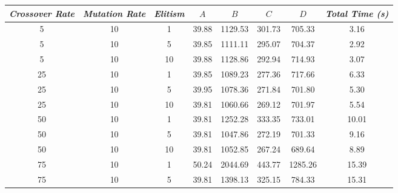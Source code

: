 
\begin{table}[h]
\centering
\footnotesize
{\renewcommand{\arraystretch}{1}}
\begin{tabular}{ccc|c|c|c|c|c}
\textit{Crossover Rate} & \textit{Mutation Rate} & \textit{Elitism} & $A$ & $B$ & $C$ & $D$ & \textit{Total Time (s)} \\\hline
5 & 10 & 1 & \cellcolor{gray!50}39.88 & \cellcolor{gray!13}1129.53 & \cellcolor{gray!1}301.73 & \cellcolor{gray!42}705.33 & 3.16\\
5 & 10 & 5 & \cellcolor{gray!50}39.85 & \cellcolor{gray!16}1111.11 & \cellcolor{gray!1}295.07 & \cellcolor{gray!42}704.37 & 2.92\\
5 & 10 & 10 & \cellcolor{gray!50}39.88 & \cellcolor{gray!13}1128.86 & \cellcolor{gray!1}292.94 & \cellcolor{gray!39}714.93 & 3.07\\
25 & 10 & 1 & \cellcolor{gray!50}39.85 & \cellcolor{gray!21}1089.23 & \cellcolor{gray!4}277.36 & \cellcolor{gray!38}717.66 & 6.33\\
25 & 10 & 5 & \cellcolor{gray!49}39.95 & \cellcolor{gray!23}1078.36 & \cellcolor{gray!10}271.84 & \cellcolor{gray!43}701.80 & 5.30\\
25 & 10 & 10 & \cellcolor{gray!50}39.81 & \cellcolor{gray!26}1060.66 & \cellcolor{gray!13}269.12 & \cellcolor{gray!43}701.97 & 5.54\\
50 & 10 & 1 & \cellcolor{gray!50}39.81 & \cellcolor{gray!1}1252.28 & \cellcolor{gray!1}333.35 & \cellcolor{gray!33}733.01 & 10.01\\
50 & 10 & 5 & \cellcolor{gray!50}39.81 & \cellcolor{gray!28}1047.86 & \cellcolor{gray!10}272.19 & \cellcolor{gray!43}701.33 & 9.16\\
50 & 10 & 10 & \cellcolor{gray!50}39.81 & \cellcolor{gray!27}1052.85 & \cellcolor{gray!15}267.24 & \cellcolor{gray!47}689.64 & 8.89\\
75 & 10 & 1 & \cellcolor{gray!1}50.24 & \cellcolor{gray!1}2044.69 & \cellcolor{gray!1}443.77 & \cellcolor{gray!1}1285.26 & 15.39\\
75 & 10 & 5 & \cellcolor{gray!50}39.81 & \cellcolor{gray!1}1398.13 & \cellcolor{gray!1}325.15 & \cellcolor{gray!17}784.33 & 15.31\\

\end{tabular}
\end{table}
